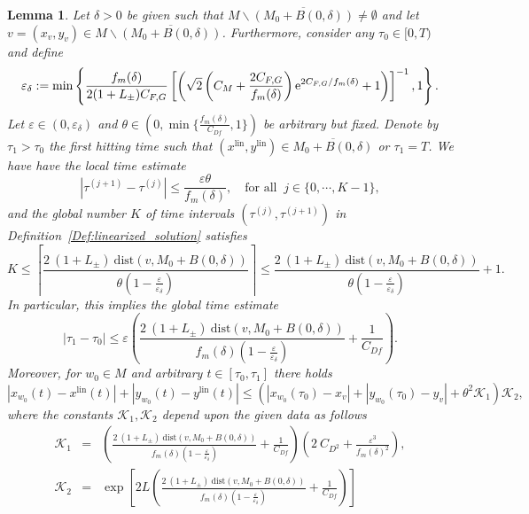\documentclass[12pt]{article}
\newtheorem{lem}[thm]{Lemma}
\def\txte{{\textnormal{e}}}
\newcommand{\be}{\begin{equation}}
\newcommand{\ee}{\end{equation}}
\newcommand{\beann}{\begin{eqnarray*}}
\newcommand{\eeann}{\end{eqnarray*}}
\newcommand{\benn}{\begin{equation*}}
\newcommand{\eenn}{\end{equation*}}
\newcommand{\cK}{{\mathcal K}}  %
\begin{document}
\begin{lem}
\label{Lem:estim:time_linearized sol}
Let $\delta>0$ be given such that $M\backslash \overline{(M_0+B(0,\delta))}
\neq \emptyset$ and let $v=(x_v,y_v)\in M\backslash \overline{(M_0+B(0,\delta))}$.
Furthermore, consider any $\tau_0\in [0,T)$ and define 
\benn
\varepsilon_\delta := 
\min\left\{\frac{f_m(\delta)}{2(1+L_\pm)C_{F,G}}
\left[\left(\sqrt{2} \left(C_M+ \frac{2C_{F,G}}{f_m(\delta)}
\right)\txte^{2C_{F,G}/f_m(\delta)}+1\right)\right]^{-1},1\right\}.
\eenn
Let $\varepsilon\in (0,\varepsilon_\delta)$ and 
$\theta \in \left(0, \min\{\frac{f_m(\delta)}{C_{Df}}, 1\} \right)$ be 
arbitrary but fixed. Denote by $\tau_1>\tau_0$ the first hitting time  
such that $(x^{\mathrm{lin}},y^{\mathrm{lin}})\in \overline{M_0+B(0,\delta)}$ or 
$\tau_1=T$. We have have the local time estimate 
\be
\label{eq:tauestlem2}
|\tau^{(j+1)}-\tau^{(j)}|\leq 
\frac{\varepsilon\theta}{f_m(\delta)},\quad \text{for all }~ 
j\in \{0,\cdots, K-1\},
\ee
and the global number $K$ of time intervals $(\tau^{(j)},\tau^{(j+1)})$ 
in Definition~\ref{Def:linearized_solution} satisfies
\be
\label{eq:keyKbound}
K\leq  \left\lceil\frac{2~(1+L_\pm)~\mathrm{dist}(v, M_0+B(0,\delta))}{\theta
\left(1-\frac{\varepsilon}{\varepsilon_\delta} \right)}\right\rceil \leq 
\frac{2~(1+L_\pm)~\mathrm{dist}(v, M_0+B(0,\delta))}{\theta\left(1-
\frac{\varepsilon}{\varepsilon_\delta}\right)} + 1.
\ee
In particular, this implies the global time estimate
\be
\label{eq:test01}
|\tau_1-\tau_0| \leq \varepsilon \left(  
\frac{2~(1+L_\pm)~\mathrm{dist}(v, M_0+B(0,\delta))}{f_m(\delta)
\left(1-\frac{\varepsilon}{\varepsilon_\delta}\right)}+ \frac{1}{C_{Df}}\right).
\ee
Moreover, for $w_0\in M$ and arbitrary $t\in [\tau_0,\tau_1]$ there holds
\be
\label{eq:solestLem}
	| x_{w_0}(t) - x^{\mathrm{lin}}(t)|
	+ | y_{w_0}(t) - y^{\mathrm{lin}}(t)|
	\leq 
\left(| x_{w_0}(\tau_0) - x_v| + | y_{w_0}(\tau_0) - y_v|
	+ \theta^2 \cK_1\right)\cK_2,
\ee	
where the constants $\cK_1,\cK_2$ depend upon the given data as follows
\beann
\cK_1&=&\left(\frac{2~(1+L_\pm)~\mathrm{dist}(v, M_0+B(0,\delta))}{f_m(\delta)\left(1-
\frac{\varepsilon}{\varepsilon_\delta}\right)}+ \frac{1}{C_{Df}}\right)
	\left(2~C_{D^2} + \frac{\varepsilon^3}{f_m(\delta)^2}\right),\\
	\cK_2&=&\exp\left[2L \left(  
	\frac{2~(1+L_\pm)~\mathrm{dist}(v, M_0+B(0,\delta))}{f_m(\delta)
	\left(1-\frac{\varepsilon}{\varepsilon_\delta}\right)}+ \frac{1}{C_{Df}}\right)\right]
\eeann
\end{lem}
\end{document}
